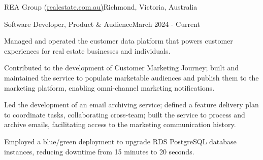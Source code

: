 \documentclass{cv}
\begin{document}
\begin{cvlist}

\begin{cvheading}{REA Group (\href{https://realestate.com.au/}{realestate.com.au)}}{Richmond, Victoria, Australia}
\begin{cvsubheading}{Software Developer, Product \& Audience}{March 2024 - Current}
    \item Managed and operated the customer data platform that powers customer experiences for real estate businesses and individuals.
    \item Contributed to the development of Customer Marketing Journey; built and maintained the service to populate marketable audiences and publish them to the marketing platform, enabling omni-channel marketing notifications.
    \item Led the development of an email archiving service; defined a feature delivery plan to coordinate tasks, collaborating cross-team; built the service to process and archive emails, facilitating access to the marketing communication history.
    \item Employed a blue/green deployment to upgrade RDS PostgreSQL database instances, reducing downtime from 15 minutes to 20 seconds.
\end{cvsubheading}
\end{cvheading}


\end{cvlist}
\end{document}
